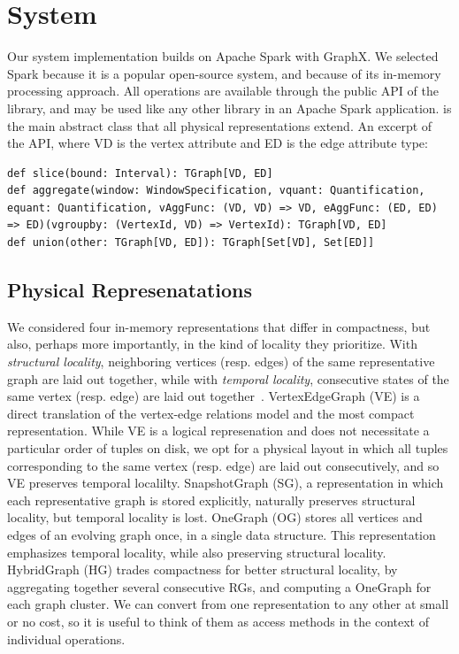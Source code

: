 \section{System}
\label{sec:sys}

Our \ql system implementation builds on Apache Spark with GraphX.  We
selected Spark because it is a popular open-source system, and because
of its in-memory processing approach.  All \tg operations are
available through the public API of the \ql library, and may be used
like any other library in an Apache Spark application.  
is the main abstract class that all physical representations extend.
An excerpt of the API, where VD is the vertex attribute and ED is the
edge attribute type:

\begin{lstlisting}
def slice(bound: Interval): TGraph[VD, ED]
def aggregate(window: WindowSpecification, vquant: Quantification, equant: Quantification, vAggFunc: (VD, VD) => VD, eAggFunc: (ED, ED) => ED)(vgroupby: (VertexId, VD) => VertexId): TGraph[VD, ED]
def union(other: TGraph[VD, ED]): TGraph[Set[VD], Set[ED]]
\end{lstlisting}

\subsection{Physical Represenatations}
\label{sec:sys:datastructs}

We considered four in-memory \tg representations that differ in
compactness, but also, perhaps more importantly, in the kind of
locality they prioritize. With {\em structural locality}, neighboring
vertices (resp. edges) of the same representative graph are laid out
together, while with {\em temporal locality}, consecutive states of
the same vertex (resp. edge) are laid out
together~\cite{DBLP:journals/tos/MiaoHLWYZPCC15}.  VertexEdgeGraph
(VE) is a direct translation of the vertex-edge relations model and
the most compact representation.  While VE is a logical represenation
and does not necessitate a particular order of tuples on disk, we opt
for a physical layout in which all tuples corresponding to the same
vertex (resp. edge) are laid out consecutively, and so VE preserves
temporal localilty.  SnapshotGraph (SG), a representation in which
each representative graph is stored explicitly, naturally preserves
structural locality, but temporal locality is lost. OneGraph (OG)
stores all vertices and edges of an evolving graph once, in a single
data structure.  This representation emphasizes temporal locality,
while also preserving structural locality.  HybridGraph (HG) trades
compactness for better structural locality, by aggregating together
several consecutive RGs, and computing a OneGraph for each graph
cluster.  We can convert from one representation to any other at small
or no cost, so it is useful to think of them as access methods in the
context of individual operations.


